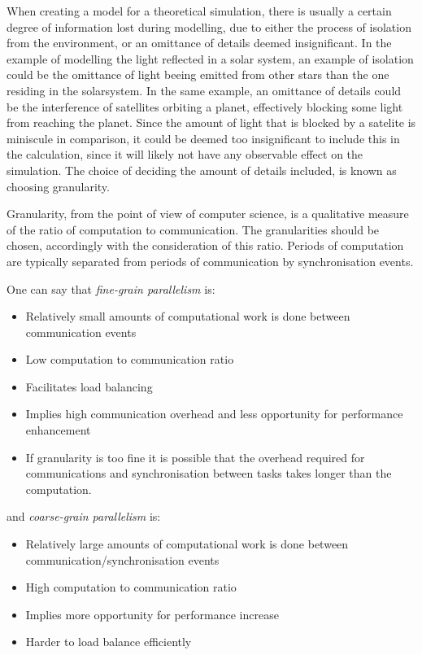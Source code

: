 When creating a model for a theoretical simulation, there is usually a certain degree of information lost during modelling, due to either the process of isolation from the environment, or an omittance of details deemed insignificant. In the example of modelling the light reflected in a solar system, an example of isolation could be the omittance of light beeing emitted from other stars than the one residing in the solarsystem. In the same example, an omittance of details could be the interference of satellites orbiting a planet, effectively blocking some light from reaching the planet. Since the amount of light that is blocked by a satelite is miniscule in comparison, it could be deemed too insignificant to include this in the calculation, since it will likely not have any observable effect on the simulation. The choice of deciding the amount of details included, is known as choosing granularity.

Granularity, from the point of view of computer science, is a qualitative measure of the ratio of computation to communication. The granularities should be chosen, accordingly with the consideration of this ratio. Periods of computation are typically separated from periods of communication by synchronisation events.

One can say that \emph{fine-grain parallelism} is:

\begin{itemize}
\item Relatively small amounts of computational work is done between communication events
\item Low computation to communication ratio
\item Facilitates load balancing
\item Implies high communication overhead and less opportunity for performance enhancement
\item If granularity is too fine it is possible that the overhead required for communications and synchronisation between tasks takes longer than the computation.
\end{itemize}

and \emph{coarse-grain parallelism} is:

\begin{itemize}
\item Relatively large amounts of computational work is done between communication/synchronisation events
\item High computation to communication ratio
\item Implies more opportunity for performance increase
\item Harder to load balance efficiently
\end{itemize}


